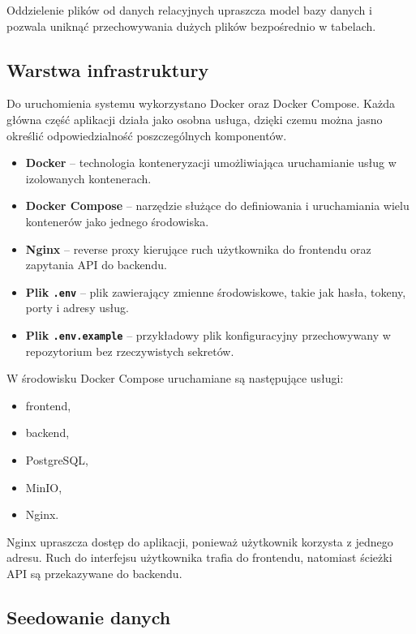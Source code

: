 Oddzielenie plików od danych relacyjnych upraszcza model bazy danych i pozwala uniknąć przechowywania dużych plików bezpośrednio w tabelach.

\subsection{Warstwa infrastruktury}

Do uruchomienia systemu wykorzystano Docker oraz Docker Compose. Każda główna część aplikacji działa jako osobna usługa, dzięki czemu można jasno określić odpowiedzialność poszczególnych komponentów.

\begin{itemize}
    \item \textbf{Docker} -- technologia konteneryzacji umożliwiająca uruchamianie usług w izolowanych kontenerach.
    \item \textbf{Docker Compose} -- narzędzie służące do definiowania i uruchamiania wielu kontenerów jako jednego środowiska.
    \item \textbf{Nginx} -- reverse proxy kierujące ruch użytkownika do frontendu oraz zapytania API do backendu.
    \item \textbf{Plik \texttt{.env}} -- plik zawierający zmienne środowiskowe, takie jak hasła, tokeny, porty i adresy usług.
    \item \textbf{Plik \texttt{.env.example}} -- przykładowy plik konfiguracyjny przechowywany w repozytorium bez rzeczywistych sekretów.
\end{itemize}

W środowisku Docker Compose uruchamiane są następujące usługi:
\begin{itemize}
    \item frontend,
    \item backend,
    \item PostgreSQL,
    \item MinIO,
    \item Nginx.
\end{itemize}

Nginx upraszcza dostęp do aplikacji, ponieważ użytkownik korzysta z jednego adresu. Ruch do interfejsu użytkownika trafia do frontendu, natomiast ścieżki API są przekazywane do backendu.

\subsection{Seedowanie danych}

